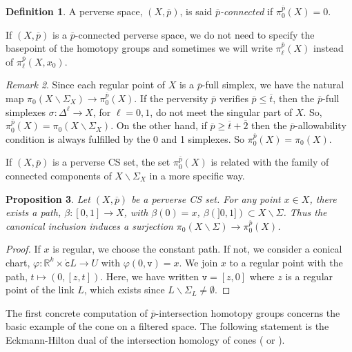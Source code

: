 \documentclass[a4paper,10pt,english,reqno]{amsart}
\theoremstyle{plain}
\newtheorem{proposition}{Proposition}[section]
\theoremstyle{definition}
\newtheorem{definition}[proposition]{Definition}
\theoremstyle{remark}
\newtheorem{remark}[proposition]{Remark}
\numberwithin{equation}{section}
\def\R{{\mathbb R}}
\def\ov{\overline}
\def\tc{{\mathtt c}}
\def\tv{{\mathtt v}}
\def\R{\mathbb{R}}
\def\rc{{\mathring{\tc}}}
\def\menos{\backslash}
\renewcommand\1{\hbox{\ding{192}}}
\renewcommand\2{\hbox{\ding{193}}}
\newcommand\3{\hbox{\ding{194}}}
\newcommand\4{\hbox{\ding{195}}}
\begin{document}
\begin{definition}\label{def:pconnexe}
A perverse space, $(X,\ov{p})$, is said \emph{$\ov{p}$-connected} if $\pi_{0}^{\ov{p}}(X)=0$.
\end{definition}

 If $(X,\ov{p})$ is a $\ov{p}$-connected perverse space, we do not need to specify the basepoint of the homotopy groups 
 and  sometimes we will write $\pi^{\ov p}_\ell (X)$ instead of $\pi^{\ov{p}}_{\ell}(X,x_{0})$.



\begin{remark}\label{exam:pi0}
 Since each regular point of $X$ is a $\ov p$-full simplex, we have the natural map $\pi_0(X \menos \Sigma_X) \to \pi_0^{\ov p} (X)$. 
 If the perversity $\ov p$ verifies $\ov p\leq \ov t$, then the  $\ov p$-full simplexes $\sigma \colon\Delta^\ell \to X$, for $\ell=0,1$,  
 do not meet the singular part of $X$. So, $\pi_0^{\ov p}(X) = \pi_0(X\menos \Sigma_X)$.  
 On the other hand, if $\ov p \geq \ov t + \ov 2$ then the $\ov p$-allowability condition is always fulfilled by the 0 and 1 simplexes.
 So $\pi_{0}^{\ov{p}}(X)=\pi_{0}(X)$.
 \end{remark}
 
If $(X,\ov{p})$ is a perverse CS set, the set $\pi_{0}^{\ov{p}}(X)$ is related with the family of connected components of $X\menos \Sigma_X$ in a more specific way.
% 

\begin{proposition}\label{prop:petitchemin}
Let $(X,\ov{p})$  be a perverse CS set. For any point $x\in X$, there exists a path,
$\beta\colon [0,1]\to X$, with $\beta(0)=x$, $\beta(]0,1])\subset X\menos \Sigma$.
%
Thus the canonical inclusion induces a surjection $\pi_{0}(X\menos \Sigma)\to \pi_{0}^{\ov{p}}(X)$.
\end{proposition}


\begin{proof}
If $x$ is regular, we choose the constant path. If not, we consider a conical chart, $\varphi\colon \R^k\times \rc L\to U$
with $\varphi(0,\tv)=x$. We join $x$  to a regular point with the path, $t \mapsto (0, [z,t])$. 
 Here, we have written $\tv = [z,0]$ where $z$ is a regular point of the link $L$, which exists  since $L\menos \Sigma_L\ne \emptyset$. 
%
\end{proof}
 
The first concrete computation of $\ov{p}$-intersection homotopy groups 
concerns the  basic example of the cone on a filtered space. 
The following statement is the Eckmann-Hilton dual of the intersection homology of cones
(\cite[Section 6]{GM1} or \cite[Proposition 5.2]{CST3}).  
\end{document}
